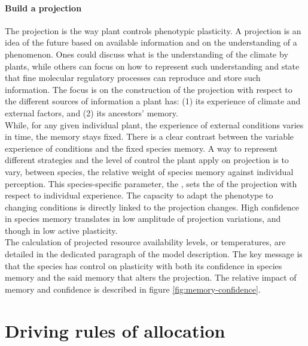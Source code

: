 \paragraph{Build a projection}
The projection is the way plant controls phenotypic plasticity. A projection is an idea of the future based on available information and on the understanding of a phenomenon. Ones could discuss what is the understanding of the climate by plants, while others can focus on how to represent such understanding and state that fine molecular regulatory processes can reproduce and store such information. The focus is on the construction of the projection with respect to the different sources of information a plant has: (1) its experience of climate and external factors, and (2) its ancestors' memory.\\
While, for any given individual plant, the experience of external conditions varies in time, the memory stays fixed. There is a clear contrast between the variable experience of conditions and the fixed species memory. A way to represent different strategies and the level of control the plant apply on projection is to vary, between species, the relative weight of species memory against individual perception. This species-specific parameter, the , sets the  of the projection with respect to individual experience. The capacity to adapt the phenotype to changing conditions is directly linked to the projection changes. High confidence in species memory translates in low amplitude of projection variations, and though in low active plasticity.\\
The calculation of projected resource availability levels, or temperatures, are detailed in the dedicated paragraph of the model description. The key message is that the species has control on plasticity with both its confidence in species memory and the said memory that alters the projection. The relative impact of memory and confidence is described in figure \ref{fig:memory-confidence}.



\section{Driving rules of allocation}\label{section:allocation-rule}


